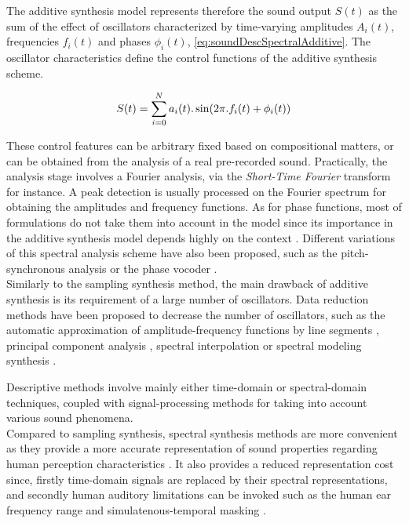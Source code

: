 {{The additive synthesis model represents therefore the sound output $S(t)$ as the sum of the effect of oscillators characterized by time-varying amplitudes $A_i(t)$, frequencies $f_i(t)$ and phases $\phi_i(t)$, \myequname \eqref{eq:soundDescSpectralAdditive}. The oscillator characteristics define the control functions of the additive synthesis scheme. 

\begin{equation}
	S(t) = \sum_{i=0}^N{a_i(t) . \sin(2\pi . f_i(t) + \phi_i(t))}
\label{eq:soundDescSpectralAdditive}
\eqcaption{Spectral additive synthesis}
\end{equation}

These control features can be arbitrary fixed based on compositional matters, or can be obtained from the analysis of a real pre-recorded sound. Practically, the analysis stage involves a Fourier analysis, via the \emph{Short-Time Fourier} transform for instance. A peak detection is usually processed on the Fourier spectrum for obtaining the amplitudes and frequency functions. As for phase functions, most of formulations do not take them into account in the model since its importance in the additive synthesis model depends highly on the context . Different variations of this spectral analysis scheme have also been proposed, such as the pitch-synchronous analysis  or the phase vocoder .\\

Similarly to the sampling synthesis method, the main drawback of additive synthesis is its requirement of a large number of oscillators. Data reduction methods have been proposed to decrease the number of oscillators, such as the automatic approximation of amplitude-frequency functions by line segments , principal component analysis , spectral interpolation  or spectral modeling synthesis .


				\label{subsubsubsec:CM_SS_Desc_Conclusion}

Descriptive methods involve mainly either time-domain or spectral-domain techniques, coupled with signal-processing methods for taking into account various sound phenomena.\\

Compared to sampling synthesis, spectral synthesis methods are more convenient as they provide a more accurate representation of sound properties regarding human perception characteristics . It also provides a reduced representation cost since, firstly time-domain signals are replaced by their spectral representations, and secondly human auditory limitations can be invoked such as the human ear frequency range and simulatenous-temporal masking .

}}

